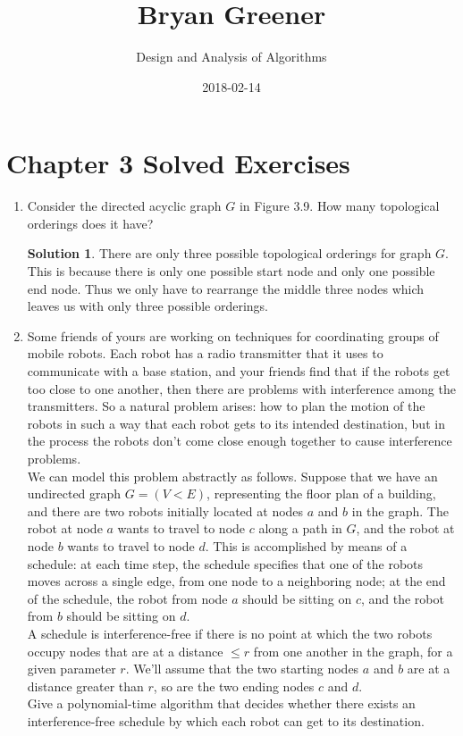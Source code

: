 \documentclass[12pt]{article}
\title{Bryan Greener}
\author{Design and Analysis of Algorithms}
\date{2018-02-14}
\theoremstyle{definition}
\newtheorem*{solution}{Solution} %
\theoremstyle{plain}
\begin{document}
\maketitle

\TabPositions{4cm}

\section*{Chapter 3 Solved Exercises}
\begin{enumerate}
\item Consider the directed acyclic graph $G$ in Figure 3.9. How many topological orderings does it have?\\
\begin{solution}
There are only three possible topological orderings for graph $G$. This is because there is only one possible start node and only one possible end node. Thus we only have to rearrange the middle three nodes which leaves us with only three possible orderings.
\end{solution}

\item Some friends of yours are working on techniques for coordinating groups of mobile robots. Each robot has a radio transmitter that it uses to communicate with a base station, and your friends find that if the robots get too close to one another, then there are problems with interference among the transmitters. So a natural problem arises: how to plan the motion of the robots in such a way that each robot gets to its intended destination, but in the process the robots don't come close enough together to cause interference problems.\\
We can model this problem abstractly as follows. Suppose that we have an undirected graph $G=(V<E)$, representing the floor plan of a building, and there are two robots initially located at nodes $a$ and $b$ in the graph. The robot at node $a$ wants to travel to node $c$ along a path in $G$, and the robot at node $b$ wants to travel to node $d$. This is accomplished by means of a schedule: at each time step, the schedule specifies that one of the robots moves across a single edge, from one node to a neighboring node; at the end of the schedule, the robot from node $a$ should be sitting on $c$, and the robot from $b$ should be sitting on $d$.\\
A schedule is interference-free if there is no point at which the two robots occupy nodes that are at a distance $\leq r$ from one another in the graph, for a given parameter $r$. We'll assume that the two starting nodes $a$ and $b$ are at a  distance greater than $r$, so are the two ending nodes $c$ and $d$.\\
Give a polynomial-time algorithm that decides whether there exists an interference-free schedule by which each robot can get to its destination.\\


\end{enumerate}
\end{document}
